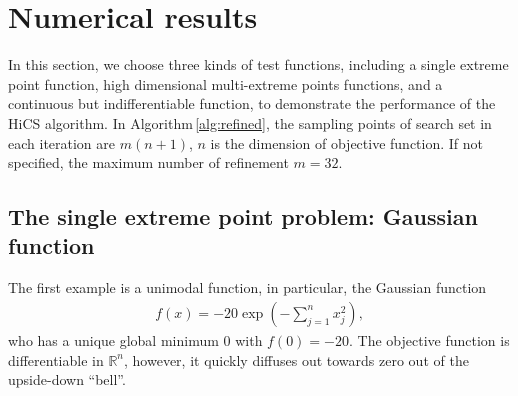 \documentclass[final,1p,times]{elsarticle}
\def\bbR{\mathbb{R}}
\begin{document}


\section{Numerical results}
\label{sec:experiment}

In this section, we choose three kinds of test functions,
including a single extreme point function, high dimensional
multi-extreme points functions, and a continuous but
indifferentiable function, to demonstrate the performance of the
HiCS algorithm. 
In Algorithm\,\ref{alg:refined}, the sampling points of 
search set in each iteration are $m(n+1)$, $n$ is the dimension
of objective function.  If not specified, the maximum number of
refinement $m=32$.

\subsection{The single extreme point problem: Gaussian function}
\label{subsec:gauss}

The first example is a unimodal function, in particular, the Gaussian function
\begin{align}
	f(x) = -20\exp\left(-\sum_{j=1}^n x_j^2 \right),
	\label{eqn:exp1}
\end{align}
who has a unique global minimum $0$ with $f(0)=-20$.
The objective function is differentiable in $\bbR^n$, however,
it quickly diffuses out towards zero out of the upside-down ``bell''. 

\end{document}
